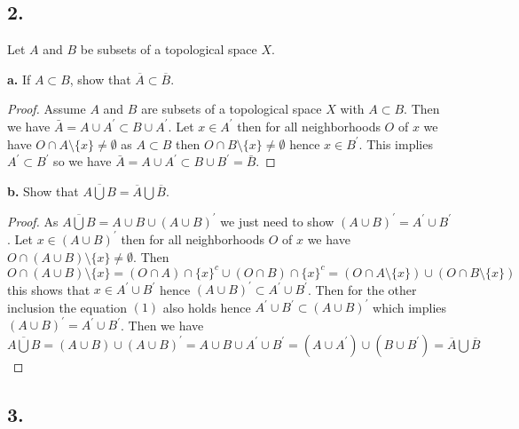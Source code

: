 \documentclass{amsart}
\theoremstyle{plain}
\theoremstyle{definition}
\theoremstyle{remark}
\begin{document}
\vspace{.15in}

\noindent
\subsection*{2.} Let $A$ and $B$ be subsets of a topological space $X$. 

\vspace{.1in}
{\bfseries a.} If $A\subset B$, show that $\overline{A} \subset \overline{B}$. 

\begin{proof}
    Assume $A$ and $B$ are subsets of a topological space $X$ with $A\subset B$. Then we have $\bar A=A\cup A^\prime\subset B\cup A^\prime$. Let $x\in A^\prime$ then for all neighborhoods $O$ of $x$ we have $O\cap A\setminus 
    \{x\}\not = \emptyset$ as $A\subset B$ then $O\cap B\setminus \{x\}\not = \emptyset$ hence $x\in B^\prime$. This implies $A^\prime\subset B^\prime$ so we have $\bar A=A\cup A^\prime \subset B\cup B^\prime = \bar B$.
\end{proof}

\vspace{.1in}
{\bfseries b.} Show that $\overline{A\bigcup B} = \overline{A} \bigcup \overline{B}$. 

\begin{proof}
    As $\overline{ A\bigcup B}= A\cup B \cup (A\cup B)^\prime$ we just need to show $(A\cup B)^\prime = A^\prime \cup B^\prime$. Let $x\in (A\cup B)^\prime$ then for all neighborhoods $O$ of $x$ we have $O\cap (A\cup B)\setminus \{x\}\not = \emptyset$. Then \begin{equation}O\cap (A\cup B)\setminus \{x\}=(O\cap A)\cap \{x\}^c\cup (O\cap B)\cap \{x\}^c = (O\cap A\setminus \{x\})\cup (O\cap B\setminus \{x\})\end{equation} this shows that $x\in A^\prime \cup B^\prime$ hence $(A\cup B)^\prime \subset A^\prime \cup B^\prime $. Then for the other inclusion the equation $(1)$ also holds hence $A^\prime \cup B^\prime \subset (A\cup B)^\prime$ which implies $(A\cup B)^\prime=A^\prime \cup B^\prime$. Then we have $\overline{ A\bigcup B}=(A\cup B) \cup (A\cup B)^\prime=A \cup B \cup A^\prime \cup B^\prime= (A\cup A^\prime) \cup (B\cup B^\prime)=\overline{A} \bigcup \overline B$
\end{proof}


\vspace{.15in}

\noindent
\subsection*{3.} 
\end{document}
